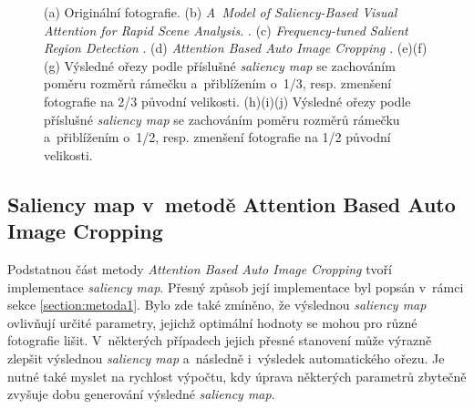 \begin{figure}[H]
\caption{(a) Originální fotografie.
(b) \emph{A~Model of Saliency-Based Visual Attention for Rapid
Scene Analysis.} \cite{Itti1998}.
(c) \emph{Frequency-tuned Salient Region Detection} \cite{Achanta2009}.
(d) \emph{Attention Based Auto Image Cropping} \cite{Stentiford2007}.
(e)(f)(g) Výsledné ořezy podle příslušné \emph{saliency map} se zachováním poměru rozměrů rámečku a~přiblížením o~1/3, resp. zmenšení fotografie na 2/3 původní velikosti.
(h)(i)(j) Výsledné ořezy podle příslušné \emph{saliency map} se zachováním poměru rozměrů rámečku a~přiblížením o~1/2, resp. zmenšení fotografie na 1/2 původní velikosti.}
\label{obr:salmapsExp}
\end{figure}


\subsection{Saliency map v~metodě Attention Based Auto Image Cropping}
Podstatnou část metody \emph{Attention Based Auto Image Cropping} \cite{Stentiford2007} tvoří implementace \emph{saliency map}. Přesný způsob její implementace byl popsán v~rámci sekce \ref{section:metoda1}. Bylo zde také zmíněno, že výslednou \emph{saliency map} ovlivňují určité parametry, jejichž optimální hodnoty se mohou pro různé fotografie lišit. V~některých případech jejich přesné stanovení může výrazně zlepšit výslednou \emph{saliency map} a~následně i~výsledek automatického ořezu. Je nutné také myslet na rychlost výpočtu, kdy úprava některých parametrů zbytečně zvyšuje dobu generování výsledné \emph{saliency map}.

